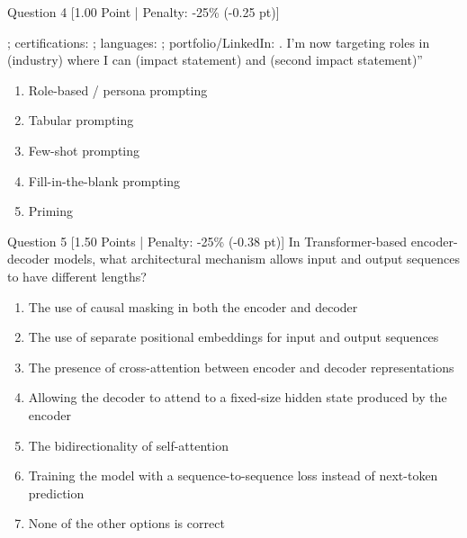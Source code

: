 \documentclass[11pt,a4paper]{article}
\begin{document}
\begin{questionbox}{Question 4 \hfill [1.00 Point | Penalty: -25\% (-0.25 pt)]}
\begin{tcolorbox}[colback=white, colframe=lightgray!80, arc=1mm, boxrule=0.5pt]
\underline{\hspace{1.2cm}}; certifications: \underline{\hspace{1.2cm}}; languages: \underline{\hspace{1.2cm}}; portfolio/LinkedIn: \underline{\hspace{1.2cm}}. I’m now targeting \underline{\hspace{1.2cm}} roles in \underline{\hspace{1.2cm}} (industry) where I can \underline{\hspace{1.2cm}} (impact statement) and \underline{\hspace{1.2cm}} (second impact statement)”
\end{tcolorbox}

\begin{enumerate}[label=\alph*., leftmargin=2em]
    \item Role-based / persona prompting
    \item Tabular prompting
    \item Few-shot prompting
    \item Fill-in-the-blank prompting
    \item Priming
\end{enumerate}
\end{questionbox}

\vspace{1.2em}

\begin{questionbox}{Question 5 \hfill [1.50 Points | Penalty: -25\% (-0.38 pt)]}
In Transformer-based encoder-decoder models, what architectural mechanism allows input and output sequences to have different lengths?

\begin{enumerate}[label=\alph*., leftmargin=2em]
    \item The use of causal masking in both the encoder and decoder
    \item The use of separate positional embeddings for input and output sequences
    \item The presence of cross-attention between encoder and decoder representations
    \item Allowing the decoder to attend to a fixed-size hidden state produced by the encoder
    \item The bidirectionality of self-attention
    \item Training the model with a sequence-to-sequence loss instead of next-token prediction
    \item None of the other options is correct
\end{enumerate}
\end{questionbox}
\end{document}
